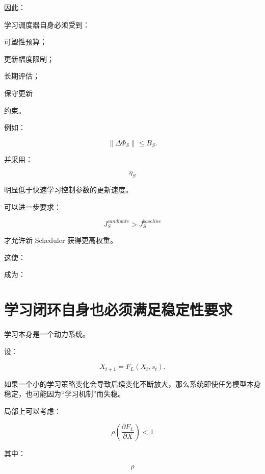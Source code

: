 因此：

\begin{statementbox}
\centering
{}
\end{statementbox}

学习调度器自身必须受到：

可塑性预算；

更新幅度限制；

长期评估；

保守更新

约束。

例如：

\[
\boxed{
\|
\Delta\Phi_S
\|
\le
B_S.
}
\]

并采用：

\[
\eta_S
\]

明显低于快速学习控制参数的更新速度。

可以进一步要求：

\[
J_S^{candidate}
>
J_S^{baseline}
\]

才允许新 Scheduler 获得更高权重。

这使：

\begin{statementbox}
\centering
{}
\end{statementbox}

成为：

\begin{statementbox}
\centering
{}
\end{statementbox}


\section{学习闭环自身也必须满足稳定性要求}

学习本身是一个动力系统。

设：

\[
X_{t+1}
=
F_L(X_t,s_t).
\]

如果一个小的学习策略变化会导致后续变化不断放大，那么系统即使任务模型本身稳定，也可能因为“学习机制”而失稳。

局部上可以考虑：

\[
\boxed{
\rho
\left(
\frac{\partial F_L}
{\partial X}
\right)
<1
}
\]

其中：

\[
\rho
\]

